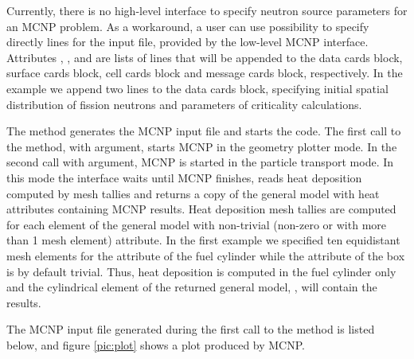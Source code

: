 \documentclass[a4paper,10pt,twocolumn,english]{sphinxsnamc2013}
\begin{document}
Currently, there is no high-level interface to specify neutron source
parameters for an MCNP problem. As a workaround, a user can use possibility to
specify directly lines for the input file, provided by the low-level MCNP
interface. Attributes , ,  and  are lists of lines that will
be appended to the data cards block, surface cards block, cell cards block and message cards
block, respectively. In the example we append two lines to the data cards
block, specifying initial spatial distribution of fission neutrons and
parameters of criticality calculations.

The  method generates the MCNP input file and starts the code. The first
call to the  method, with  argument, starts MCNP in the
geometry plotter mode.  In the second call with  argument, MCNP is
started in the particle transport mode. In this mode the interface waits until
MCNP finishes, reads heat deposition computed by mesh tallies and returns a
copy of the general model with heat attributes containing MCNP
results. Heat deposition mesh tallies are computed for each element of the
general model with non-trivial (non-zero or with more than 1 mesh element)
 attribute. In the first example we specified ten equidistant mesh
elements for the  attribute of the fuel cylinder while the 
attribute of the box is by default trivial. Thus, heat deposition is
computed in the fuel cylinder only and the cylindrical element of the returned
general model, , will contain the results.

The MCNP input file generated during the first call to the  method is listed below, and
figure \ref{pic:plot} shows a plot produced by MCNP.
\end{document}
